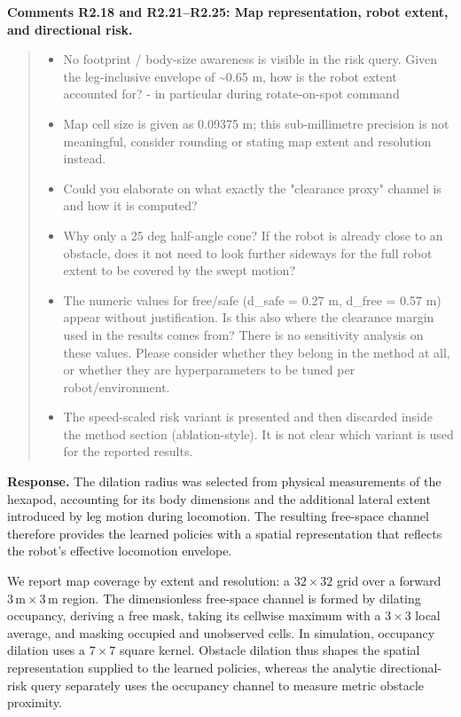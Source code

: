 \documentclass[letterpaper,11pt]{article}
\begin{document}
\noindent\textbf{Comments R2.18 and R2.21--R2.25: Map representation, robot extent, and directional risk.}
\begin{quote}\color{reviewgray}
\begin{itemize}[leftmargin=*,nosep,label={}]
\item[\textbf{R2.18.}] No footprint / body-size awareness is visible in the risk query. Given the leg-inclusive envelope of \textasciitilde{}0.65 m, how is the robot extent accounted for? - in particular during rotate-on-spot command
\item[\textbf{R2.21.}] Map cell size is given as 0.09375 m; this sub-millimetre precision is not meaningful, consider rounding or stating map extent and resolution instead.
\item[\textbf{R2.22.}] Could you elaborate on what exactly the "clearance proxy" channel is and how it is computed?
\item[\textbf{R2.23.}] Why only a 25 deg half-angle cone? If the robot is already close to an obstacle, does it not need to look further sideways for the full robot extent to be covered by the swept motion?
\item[\textbf{R2.24.}] The numeric values for free/safe (d\_safe = 0.27 m, d\_free = 0.57 m) appear without justification. Is this also where the clearance margin used in the results comes from? There is no sensitivity analysis on these values. Please consider whether they belong in the method at all, or whether they are hyperparameters to be tuned per robot/environment.
\item[\textbf{R2.25.}] The speed-scaled risk variant is presented and then discarded inside the method section (ablation-style). It is not clear which variant is used for the reported results.
\end{itemize}
\end{quote}
\noindent\textbf{Response.}
The dilation radius was selected from physical measurements of the hexapod, accounting for its body dimensions and the additional lateral extent introduced by leg motion during locomotion. The resulting free-space channel therefore provides the learned policies with a spatial representation that reflects the robot's effective locomotion envelope.

We report map coverage by extent and resolution: a $32\times32$ grid over a forward $3\,\mathrm{m}\times3\,\mathrm{m}$ region. The dimensionless free-space channel is formed by dilating occupancy, deriving a free mask, taking its cellwise maximum with a $3\times3$ local average, and masking occupied and unobserved cells. In simulation, occupancy dilation uses a $7\times7$ square kernel. Obstacle dilation thus shapes the spatial representation supplied to the learned policies, whereas the analytic directional-risk query separately uses the occupancy channel to measure metric obstacle proximity.
\end{document}
